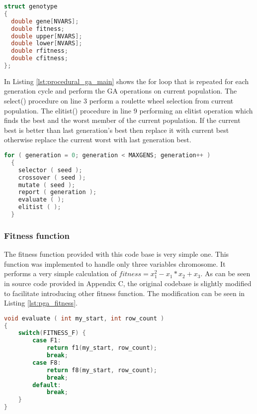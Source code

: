 \begin{lstlisting}[language=C, caption={GENOTYPE: Data structure of population member.}, label={lst:procedural_ga_struct}]
struct genotype
{
  double gene[NVARS];
  double fitness;
  double upper[NVARS];
  double lower[NVARS];
  double rfitness;
  double cfitness;
};
\end{lstlisting}

In Listing \ref{lst:procedural_ga_main} shows the for loop that is repeated for each generation cycle and perform the GA operations on current population. The select() procedure on line 3 perform a roulette wheel selection from current population. The elitist() procedure in line 9 performing an elitist operation which finds the best and the worst member of the current population. If the current best is better than last generation's best then replace it with current best otherwise replace the current worst with last generation best. 

\begin{lstlisting}[language=C, caption={Main loop controlling the GA operations.}, label={lst:procedural_ga_main}]
  for ( generation = 0; generation < MAXGENS; generation++ )
  {
    selector ( seed );
    crossover ( seed );
    mutate ( seed );
    report ( generation );
    evaluate ( );
    elitist ( );
  }
\end{lstlisting}


\subsubsection{Fitness function}
The fitness function provided with this code base is very simple one. This function was implemented to handle only three variables chromosome. It performs a very simple calculation of $ fitness = x_1^2 - x_1 * x_2 + x_3 $. As can be seen in source code provided in Appendix C, the original codebase is slightly modified to facilitate introducing other fitness function. The modification can be seen in Listing \ref{lst:pga_fitness}. 

\begin{lstlisting}[language=C, caption={Fitness function - Implementation of Griewank function}, label={lst:pga_fitness}]
void evaluate ( int my_start, int row_count )
{
    switch(FITNESS_F) {
        case F1:
            return f1(my_start, row_count);
            break;
        case F8:
            return f8(my_start, row_count);
            break;
        default:
            break;
    }
}
\end{lstlisting}

